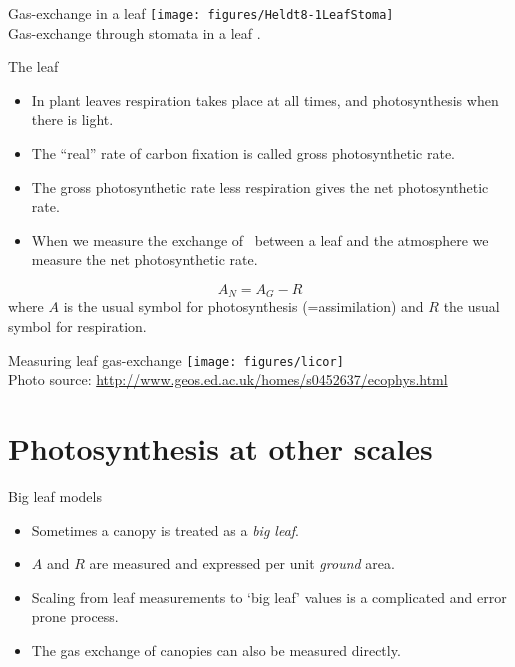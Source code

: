 \documentclass[10pt]{beamer}
\begin{document}
\begin{frame}{Gas-exchange in a leaf}
    \centering
    \texttt{[image: figures/Heldt8-1LeafStoma]}\\
    {\small Gas-exchange through stomata in a leaf \autocite[from][]{Heldt1997}.}
\end{frame}

\begin{frame}{The leaf}
    \begin{itemize}
        \item In plant leaves respiration takes place at all times,
        and photosynthesis when there is light.
        \item The ``real'' rate of carbon fixation is called gross
        photosynthetic rate.
        \item The gross photosynthetic rate less respiration
        gives the net photosynthetic rate.
        \item When we measure the exchange of \COtwo\ between a leaf
        and the atmosphere we measure the net photosynthetic rate.
    \end{itemize}
    {$$ A_N = A_G - R $$
    where $A$ is the usual symbol for photosynthesis (=assimilation)
    and $R$ the usual symbol for respiration.}
\end{frame}

\begin{frame}{Measuring leaf gas-exchange}
    \centering
    \texttt{[image: figures/licor]}\\
    {\small Photo source: \url{http://www.geos.ed.ac.uk/homes/s0452637/ecophys.html}}
\end{frame}


\section{Photosynthesis at other scales}

\begin{frame}{Big leaf models}
    \begin{itemize}
        \item Sometimes a canopy is treated as a \emph{big leaf}.
        \item $A$ and $R$ are measured and expressed per unit
        \emph{ground} area.
        \item Scaling from leaf measurements to `big leaf' values is
        a complicated and error prone process.
        \item The gas exchange of canopies can also be measured directly.
    \end{itemize}
\end{frame}
\end{document}
